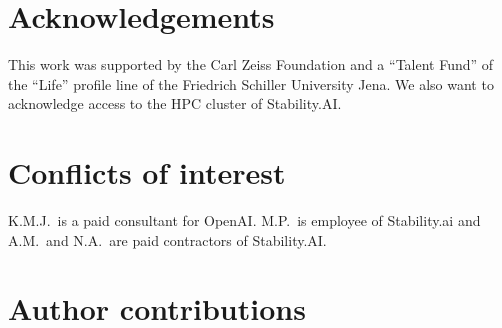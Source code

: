 \documentclass[11pt, oneside]{article}
\begin{document}
\section*{Acknowledgements}
This work was supported by the Carl Zeiss Foundation and a \enquote{Talent Fund} of the \enquote{Life} profile line of the Friedrich Schiller University Jena.
We also want to acknowledge access to the HPC cluster of Stability.AI.

\section*{Conflicts of interest}
K.M.J.\ is a paid consultant for OpenAI. M.P.\ is employee of Stability.ai and A.M.\ and N.A.\ are paid contractors of Stability.AI.

\section*{Author contributions}

\footnotesize
\insertcredits
\normalsize



\appendix

\end{document}
